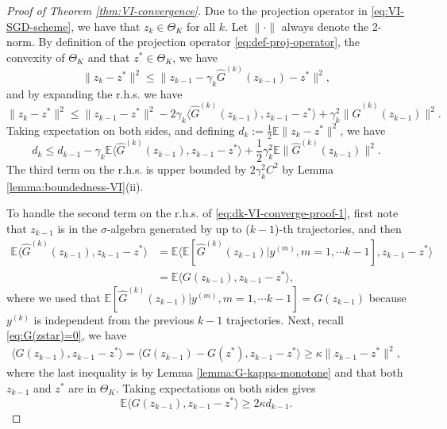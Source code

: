 \documentclass[11pt]{article}
\theoremstyle{remark}
\theoremstyle{plain}
\newcommand{\E}{\mathbb{E}}
\begin{document}
%
\begin{proof}[Proof of Theorem \ref{thm:VI-convergence}]
Due to the projection operator in \eqref{eq:VI-SGD-scheme}, we have that $z_k \in \Theta_K$ for all $k$.
Let $\| \cdot \|$ always denote the 2-norm.
By definition of the projection operator \eqref{eq:def-proj-operator}, the convexity of $\Theta_K$ and that $z^* \in \Theta_K$,
we have
\[
\| z_k - z^* \|^2 
\le \| z_{k-1} - \gamma_k \hat G^{(k)}(z_{k-1}) - z^* \|^2,
\]
and by expanding the r.h.s. we have
\[
\| z_k - z^* \|^2 
\le \| z_{k-1} -z^*\|^2 
	- 2  \gamma_k \langle \hat G^{(k)}(z_{k-1}), z_{k-1} - z^* \rangle
	+ \gamma_k^2 \|\hat G^{(k)}(z_{k-1}) \|^2.
\]
Taking expectation on both sides, and defining $d_k := \frac{1}{2} \E \| z_k - z^*\|^2$, we have
\begin{equation}\label{eq:dk-VI-converge-proof-1}
d_k \le d_{k-1} - \gamma_k \E \langle \hat G^{(k)}(z_{k-1}), z_{k-1} - z^* \rangle 
	+ \frac{1}{2}\gamma_k^2 \E \|\hat G^{(k)}(z_{k-1}) \|^2.
\end{equation}
The third term on the r.h.s. is upper bounded by $2 \gamma_k^2 C^2$ by Lemma \ref{lemma:boundedness-VI}(ii).

To handle the second term on the r.h.s. of \eqref{eq:dk-VI-converge-proof-1}, first note that $z_{k-1}$ is in the $\sigma$-algebra generated by up to ($k-1$)-th trajectories, 
and then
\begin{align*}
\E \langle \hat G^{(k)}(z_{k-1}), z_{k-1} - z^* \rangle
& =  \E \langle  \E [ \hat G^{(k)}(z_{k-1}) | y^{(m)}, m=1, \cdots k-1 ] , z_{k-1} - z^* \rangle \\
& =  \E  \langle G(z_{k-1}), z_{k-1} - z^* \rangle,
\end{align*}
where we used that $\E [ \hat G^{(k)}(z_{k-1}) | y^{(m)}, m=1, \cdots k-1 ]  = G(z_{k-1})$ because $y^{(k)}$ is independent from the previous $k-1$ trajectories. 
Next, recall \eqref{eq:G(zstar)=0}, we have
\begin{align*}
 \langle G(z_{k-1}), z_{k-1} - z^* \rangle 
 =  \langle G(z_{k-1}) - G(z^*), z_{k-1} - z^* \rangle  
 \ge \kappa \| z_{k-1} - z^*\|^2,
\end{align*}
where the last inequality is by Lemma \ref{lemma:G-kappa-monotone} and that both $z_{k-1}$ and $z^*$ are in $\Theta_K$. Taking expectations on both sides gives
\[
\E \langle G(z_{k-1}), z_{k-1} - z^* \rangle  \ge 2 \kappa d_{k-1}.
\]



\end{proof}
\end{document}
